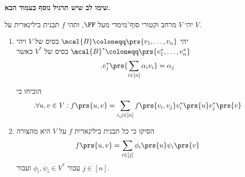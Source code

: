 \documentclass[a4paper,10pt,twoside,openany]{article}
\begin{document}
\vspace{10pt}

\textbf{שימו לב שיש תרגיל נוסף בעמוד הבא.}

\newpage

\begin{exercise}
יהי
$V$
מרחב וקטורי סוף־מימדי מעל
$\FF$,
ותהי
$f$
תבנית בילינארית על
$V$.

\begin{enumerate}
\item
יהי
$\mcal{B} \coloneqq \prs{v_1, \ldots, v_n}$
בסיס של
$V$
ויהי
$\mcal{B}^* \coloneqq \prs{v_1^*, \ldots, v_n^*}$
בסיס של
$V^*$
כאשר
\begin{align*}
\text{.} v_j^* \prs{\sum_{i \in [n]} \alpha_i v_i} = \alpha_j
\end{align*}

הוכיחו כי
\begin{align*}
\text{.} \forall u,v \in V: f\prs{u,v} = \sum_{i,j \in [n]} f\prs{v_i, v_j} v_i^*\prs{u} v_j^*\prs{v}
\end{align*}

\item הסיקו כי כל תבנית בילינארית
$f$
על
$V$
היא מהצורה
\begin{align*}
f\prs{u,v} = \sum_{i \in [j]} \phi_i\prs{u} \psi_i\prs{v}
\end{align*}
עבור
$\phi_i, \psi_i \in V^*$
ועבור
$j \in [n]$.
\end{enumerate}
\end{exercise}
\end{document}
